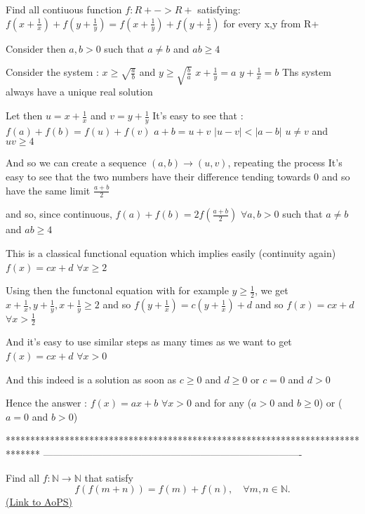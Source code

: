 \begin{solution}
	\begin{tcolorbox}Find all contiuous function $f:R+->R+$ satisfying:
$f(x+\frac{1}{x})+f(y+\frac{1}{y})=f(x+\frac{1}{y})+f(y+\frac{1}{x})$ for every x,y from R+\end{tcolorbox}
Consider then $a,b>0$ such that $a\ne b$ and $ab\ge 4$

Consider the system :
$x\ge \sqrt{\frac ab}$ and $y\ge\sqrt{\frac ba}$
$x+\frac 1y=a$
$y+\frac 1x=b$
Ths system always have a unique real solution

Let then $u=x+\frac 1x$ and $v=y+\frac 1y$
It's easy to see that :
$f(a)+f(b)=f(u)+f(v)$
$a+b=u+v$
$|u-v|<|a-b|$
$u\ne v$ and $uv\ge 4$

And so we can create a sequence $(a,b)\to (u,v)$, repeating the process
It's easy to see that the two numbers have their difference tending towards 0 and so have the same limit $\frac {a+b}2$

and so, since continuous, $f(a)+f(b)=2f(\frac{a+b}2)$  $\forall a,b>0$ such that $a\ne b$ and $ab\ge 4$

This is a classical functional equation which implies easily (continuity again) $f(x)=cx+d$ $\forall x\ge 2$

Using then the functonal equation with for example $y\ge \frac 12$, we get $x+\frac 1x,y+\frac 1y, x+\frac 1y\ge 2$ and so $f(y+\frac 1x)=c(y+\frac 1x)+d$ and so $f(x)=cx+d$ $\forall x>\frac 12$

And it's easy to use similar steps as many times as we want to get $f(x)=cx+d$ $\forall x>0$

And this indeed is a solution as soon as $c\ge 0$ and $d\ge 0$ or $c=0$ and $d>0$

Hence the answer : $\boxed{f(x)=ax+b}$ $\forall x>0$ and for any ($a>0$ and $b\ge 0$) or ($a=0$ and $b>0$)
\end{solution}
*******************************************************************************
-------------------------------------------------------------------------------

\begin{problem}
	Find all $f:\mathbb{N}\rightarrow \mathbb{N}$ that satisfy
\[f(f(m+n))=f(m)+f(n), \quad \forall m, n\in \mathbb{N}.\]
	\flushright \href{https://artofproblemsolving.com/community/c6h401032}{(Link to AoPS)}
\end{problem}



